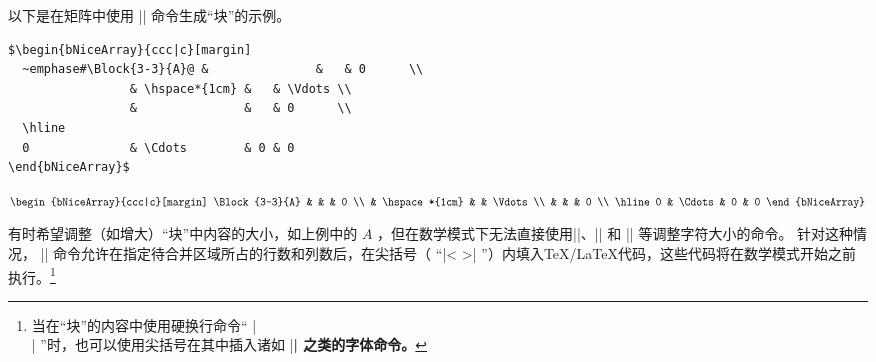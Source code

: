 \documentclass[dvipsnames]{article}%
\def\interitem{\vspace{7mm plus 2 mm minus 3mm}}
\begin{document}
\interitem
以下是在矩阵中使用 |\Block| 命令生成“块”的示例。

\bigskip
\begin{BVerbatim}[baseline=c,boxwidth=11cm]
$\begin{bNiceArray}{ccc|c}[margin]
  ~emphase#\Block{3-3}{A}@ &               &   & 0      \\
                 & \hspace*{1cm} &   & \Vdots \\
                 &               &   & 0      \\
  \hline
  0              & \Cdots        & 0 & 0
\end{bNiceArray}$
\end{BVerbatim}
$\begin{bNiceArray}{ccc|c}[margin]
\Block{3-3}{A} & & & 0 \\
& \hspace*{1cm} & & \Vdots \\
& & & 0 \\
\hline
0 & \Cdots& 0 & 0
\end{bNiceArray}$

\bigskip
有时希望调整（如增大）“块”中内容的大小，如上例中的 $A$ ，但在数学模式下无法直接使用|\large|、|\Large| 和 |\LARGE| 等调整字符大小的命令。
针对这种情况， |\Block| 命令允许在指定待合并区域所占的行数和列数后，在尖括号（ “|< >| ”）内填入\TeX/\LaTeX 代码，这些代码将在数学模式开始之前执行。\footnote{当在“块”的内容中使用硬换行命令“ |\\| ”时，也可以使用尖括号在其中插入诸如 |\bfseries| 之类的字体命令。}
\end{document}

